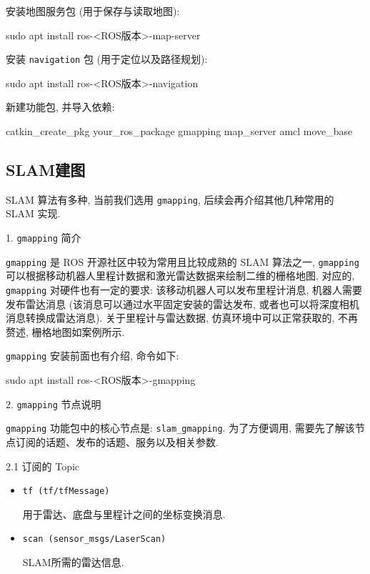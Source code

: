 \documentclass[openany, fontset=windowsold]{ctexbook}
\theoremstyle{kaiti}
\theoremstyle{normal}
\begin{document}
安装地图服务包 (用于保存与读取地图):

\begin{bash}
  sudo apt install ros-<ROS版本>-map-server
\end{bash}

安装 \verb|navigation| 包 (用于定位以及路径规划):

\begin{bash}
  sudo apt install ros-<ROS版本>-navigation
\end{bash}

新建功能包, 并导入依赖: 

\begin{bash}
  catkin_create_pkg your_ros_package gmapping map_server amcl move_base
\end{bash}

\subsection{SLAM建图}

SLAM 算法有多种, 当前我们选用 \verb|gmapping|, 后续会再介绍其他几种常用的 SLAM 实现.

1. \verb|gmapping| 简介

\verb|gmapping| 是 ROS 开源社区中较为常用且比较成熟的 SLAM 算法之一, \verb|gmapping| 可以根据移动机器人里程计数据和激光雷达数据来绘制二维的栅格地图, 对应的, \verb|gmapping| 对硬件也有一定的要求: 该移动机器人可以发布里程计消息, 机器人需要发布雷达消息 (该消息可以通过水平固定安装的雷达发布, 或者也可以将深度相机消息转换成雷达消息). 关于里程计与雷达数据, 仿真环境中可以正常获取的, 不再赘述, 栅格地图如案例所示.

\verb|gmapping| 安装前面也有介绍, 命令如下:

\begin{bash}
  sudo apt install ros-<ROS版本>-gmapping
\end{bash}

2. \verb|gmapping| 节点说明

\verb|gmapping| 功能包中的核心节点是: \verb|slam_gmapping|. 为了方便调用, 需要先了解该节点订阅的话题、发布的话题、服务以及相关参数.

2.1 订阅的 Topic

\begin{itemize}
  \item \verb|tf (tf/tfMessage)|

  用于雷达、底盘与里程计之间的坐标变换消息.

  \item \verb|scan (sensor_msgs/LaserScan)|

  SLAM所需的雷达信息.
\end{itemize}
\end{document}
